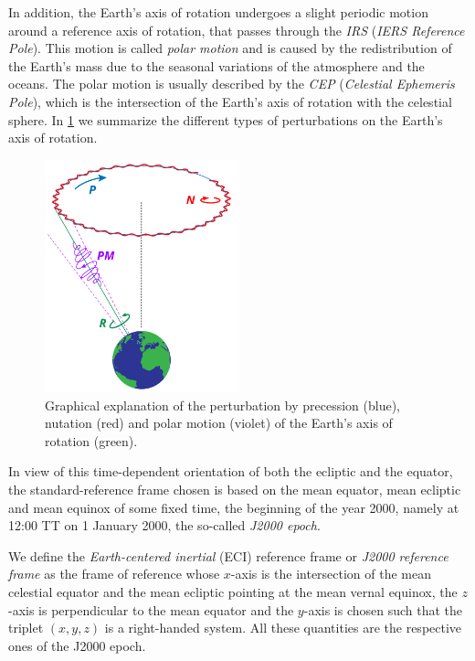 \documentclass[../main.tex]{subfiles}
\begin{document}
In addition, the Earth's axis of rotation undergoes a slight periodic motion around a reference axis of rotation, that passes through the \emph{IRS} (\emph{IERS Reference Pole}). This motion is called \emph{polar motion} and is caused by the redistribution of the Earth's mass due to the seasonal variations of the atmosphere and the oceans. The polar motion is usually described by the \emph{CEP} (\emph{Celestial Ephemeris Pole}), which is the intersection of the Earth's axis of rotation with the celestial sphere. In \cref{fig:prec_nut} we summarize the different types of perturbations on the Earth's axis of rotation.

\begin{figure}[ht]
  \centering
  \includegraphics[width=0.5\textwidth]{Images/precession_nutation.pdf}
  \caption{Graphical explanation of the perturbation by precession (blue), nutation (red) and polar motion (violet) of the Earth's axis of rotation (green).}
  \label{fig:prec_nut}
\end{figure}

In view of this time-dependent orientation of both the ecliptic and the equator, the standard-reference frame chosen is based on the mean equator, mean ecliptic and mean equinox of some fixed time, the beginning of the year 2000, namely at 12:00 TT on 1 January 2000, the so-called \emph{J2000 epoch}.
\begin{definition}
  We define the \emph{Earth-centered inertial} (ECI) reference frame or \emph{J2000 reference frame} as the frame of reference whose $x$-axis is the intersection of the mean celestial equator and the mean ecliptic pointing at the mean vernal equinox, the $z$-axis is perpendicular to the mean equator and the $y$-axis is chosen such that the triplet $(x,y,z)$ is a right-handed system. All these quantities are the respective ones of the J2000 epoch.
\end{definition}
\end{document}
